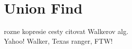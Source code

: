 \section{Union Find}
rozne kopresie cesty
citovat Walkerov alg.
\\
Yahoo! Walker, Texas ranger, FTW!